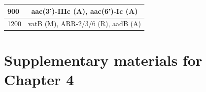 \begin{table}[!hpt]
\begin{tabular}{|l|c|}
900         & aac(3’)-IIIc (A), aac(6’)-Ic (A)                                                                                                                                                                                                     \\ \hline
1200        & vatB (M), ARR-2/3/6 (R), aadB (A)                                                                                                                                                                                                    \\ \hline
\end{tabular}
\end{table}

\chapter{Supplementary materials for Chapter 4}\label{app:npgraph}
\newpage

